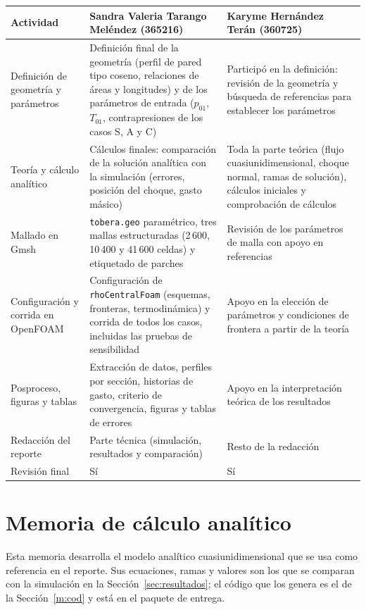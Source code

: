 \documentclass[12pt,letterpaper]{article}
\numberwithin{equation}{section}
\begin{document}
\begin{table}[H]
\centering
\renewcommand{\arraystretch}{1.25}
\small
\begin{tabular}{p{3.6cm}p{5.6cm}p{5.6cm}}
\toprule
\textbf{Actividad} & \textbf{Sandra Valeria Tarango Meléndez (365216)} & \textbf{Karyme Hernández Terán (360725)} \\
\midrule
Definición de geometría y parámetros & Definición final de la geometría (perfil de pared tipo coseno, relaciones de áreas y longitudes) y de los parámetros de entrada ($p_{01}$, $T_{01}$, contrapresiones de los casos S, A y C) & Participó en la definición: revisión de la geometría y búsqueda de referencias para establecer los parámetros \\
Teoría y cálculo analítico & Cálculos finales: comparación de la solución analítica con la simulación (errores, posición del choque, gasto másico) & Toda la parte teórica (flujo cuasiunidimensional, choque normal, ramas de solución), cálculos iniciales y comprobación de cálculos \\
Mallado en Gmsh & \texttt{tobera.geo} paramétrico, tres mallas estructuradas (2\,600, 10\,400 y 41\,600 celdas) y etiquetado de parches & Revisión de los parámetros de malla con apoyo en referencias \\
Configuración y corrida en OpenFOAM & Configuración de \texttt{rhoCentralFoam} (esquemas, fronteras, termodinámica) y corrida de todos los casos, incluidas las pruebas de sensibilidad & Apoyo en la elección de parámetros y condiciones de frontera a partir de la teoría \\
Posproceso, figuras y tablas & Extracción de datos, perfiles por sección, historias de gasto, criterio de convergencia, figuras y tablas de errores & Apoyo en la interpretación teórica de los resultados \\
Redacción del reporte & Parte técnica (simulación, resultados y comparación) & Resto de la redacción \\
Revisión final & Sí & Sí \\
\bottomrule
\end{tabular}
\end{table}

\clearpage
\section{Memoria de cálculo analítico}
\label{anexo:memoria}

Esta memoria desarrolla el modelo analítico cuasiunidimensional que se usa como referencia en el reporte. Sus ecuaciones, ramas y valores son los que se comparan con la simulación en la Sección~\ref{sec:resultados}; el código que los genera es el de la Sección~\ref{m:cod} y está en el paquete de entrega.

\begingroup\small\setlength{\parindent}{0pt}\setlength{\parskip}{0.4em}

\endgroup
\end{document}
